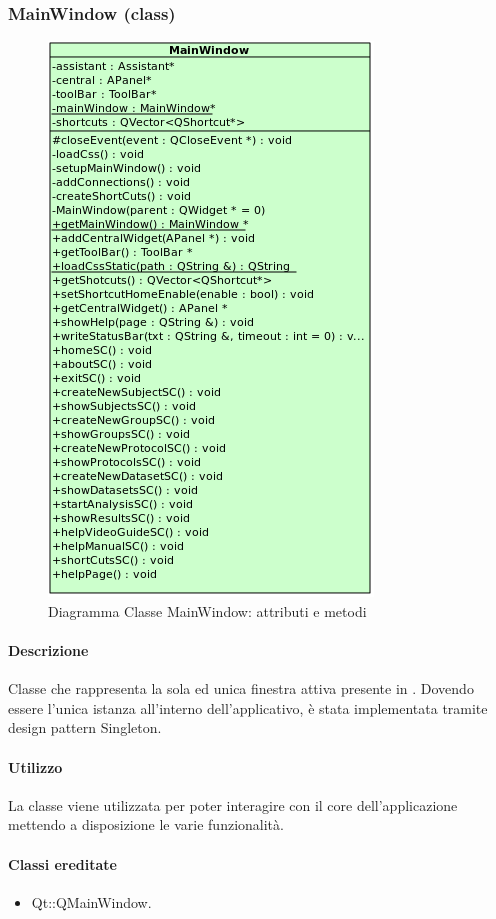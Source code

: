 \subsubsection{MainWindow (class)}
\label{speMainWindow}
\begin{figure}[!h]
\centering
			\includegraphics[width=0.6\linewidth]{./Content/Immagini/view/MainWindow.png}
			\caption{Diagramma Classe MainWindow: attributi e metodi}
			\label{cl_mainWind}
\end{figure}
\paragraph{Descrizione \\}
Classe che rappresenta la sola ed unica finestra attiva presente in \project{}. Dovendo essere l'unica istanza all'interno dell'applicativo, è stata implementata tramite design pattern\g{} Singleton.
\paragraph{Utilizzo\\}
La classe viene utilizzata per poter interagire con il core dell'applicazione mettendo a disposizione le varie funzionalità.
\paragraph{Classi ereditate\\}
\begin{itemize}
\item Qt::QMainWindow.
\end{itemize}
